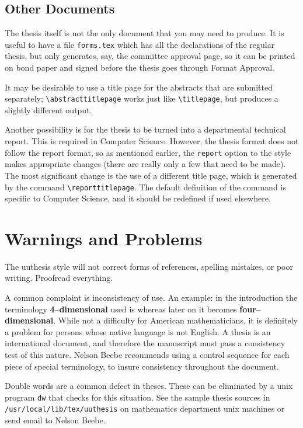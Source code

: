 \subsection{Other Documents}

The thesis itself is not the only document that you may need to produce.
It is useful to have a file \verb|forms.tex| which has all the
declarations of the regular thesis, but only generates, say, the
committee approval page, so it can be printed on bond paper and signed
before the thesis goes through Format Approval.

It may be desirable to use a title page for the abstracts that are
submitted separately; \verb|\abstracttitlepage| works just like
\verb|\titlepage|, but produces a slightly different output.

Another possibility is for the thesis to be turned into a departmental
technical report.  This is required in Computer Science.  However, the
thesis format does not follow the report format, so as mentioned
earlier, the \verb|report| option to the style makes appropriate changes
(there are really only a few that need to be made). The most significant
change is the use of a different title page, which is generated by the
command \verb|\reporttitlepage|. The default definition of the command
is specific to Computer Science, and it should be redefined if used
elsewhere.

\section{Warnings and Problems}

The uuthesis style will not correct forms of references, spelling
mistakes, or poor writing.  Proofread everything.

A common complaint is inconsistency of use. An example: in the
introduction the terminology {\bf 4--dimensional} used is whereas later
on it becomes {\bf four--dimensional}. While not a difficulty for
American mathematicians, it is definitely a problem for persons whose
native language is not English. A thesis is an international document,
and therefore the manuscript must pass a consistency test of this
nature. Nelson Beebe recommends using a control sequence for each piece
of special terminology, to insure consistency throughout the document.

Double words are a common defect in theses. These can be eliminated by a
unix program {\tt dw} that checks for this situation. See the sample
thesis sources in {\tt /usr/local/lib/tex/uuthesis} on mathematics
department unix machines or send email to Nelson Beebe.

